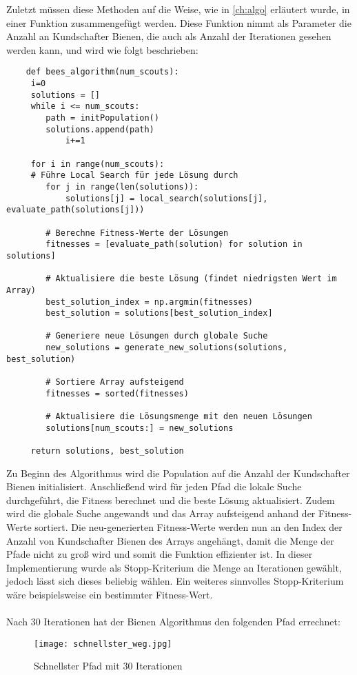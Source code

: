 Zuletzt müssen diese Methoden auf die Weise, wie in \autoref{ch:algo} erläutert wurde, in einer Funktion zusammengefügt werden. Diese Funktion nimmt als Parameter die Anzahl an Kundschafter Bienen, die auch als Anzahl der Iterationen gesehen werden kann, und wird wie folgt beschrieben:

\begin{verbatim}
    def bees_algorithm(num_scouts):
     i=0
     solutions = []
     while i <= num_scouts:    
        path = initPopulation()
        solutions.append(path)
            i+=1
    
     for i in range(num_scouts):
     # Führe Local Search für jede Lösung durch
        for j in range(len(solutions)):
            solutions[j] = local_search(solutions[j], evaluate_path(solutions[j]))
    
        # Berechne Fitness-Werte der Lösungen
        fitnesses = [evaluate_path(solution) for solution in solutions]
    
        # Aktualisiere die beste Lösung (findet niedrigsten Wert im Array)
        best_solution_index = np.argmin(fitnesses)
        best_solution = solutions[best_solution_index]
    
        # Generiere neue Lösungen durch globale Suche
        new_solutions = generate_new_solutions(solutions, best_solution)
    
        # Sortiere Array aufsteigend
        fitnesses = sorted(fitnesses)
    
        # Aktualisiere die Lösungsmenge mit den neuen Lösungen
        solutions[num_scouts:] = new_solutions
    
     return solutions, best_solution
\end{verbatim}
\vspace*{-3mm}
\vspace*{3mm}

Zu Beginn des Algorithmus wird die Population auf die Anzahl der Kundschafter Bienen initialisiert. Anschließend wird für jeden Pfad die lokale Suche durchgeführt, die Fitness berechnet und die beste Lösung aktualisiert. Zudem wird die globale Suche angewandt und das Array aufsteigend anhand der Fitness-Werte sortiert. Die neu-generierten Fitness-Werte werden nun an den Index der Anzahl von Kundschafter Bienen des Arrays angehängt, damit die Menge der Pfade nicht zu groß wird und somit die Funktion effizienter ist.  
In dieser Implementierung wurde als Stopp-Kriterium die Menge an Iterationen gewählt, jedoch lässt sich dieses beliebig wählen. Ein weiteres sinnvolles Stopp-Kriterium wäre beispielsweise ein bestimmter Fitness-Wert. \\\\
Nach 30 Iterationen hat der Bienen Algorithmus den folgenden Pfad errechnet:
\begin{figure}[H]
    \centering
    \texttt{[image: schnellster\_weg.jpg]}
    \caption{Schnellster Pfad mit 30 Iterationen\\}   
    \label{fig:schnellster}
\end{figure}

